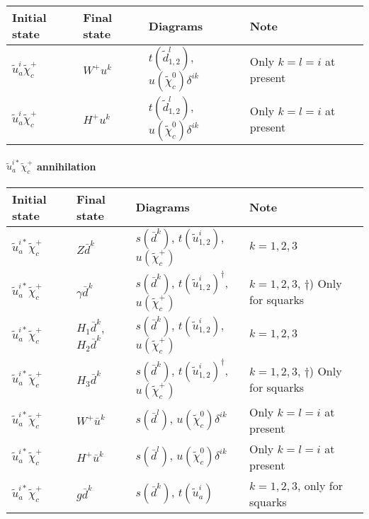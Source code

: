 \begin{center}
\begin{tabular}{llll} \hline
{\bfseries Initial state} & {\bfseries Final state} &
{\bfseries Diagrams} & {\bfseries Note} \\ \hline \tabspace
$\tilde{u}^i_a \tilde{\chi}_{c}^+$ & $W^+ u^k$ &
$t(\tilde{d}^l_{1,2})$, $u(\tilde{\chi}_c^0)\delta^{ik}$ &
Only $k=l=i$ at present \\
$\tilde{u}^i_a \tilde{\chi}_{c}^+$ & $H^+ u^k$ &
$t(\tilde{d}^l_{1,2})$, $u(\tilde{\chi}_c^0)\delta^{ik}$ 
& Only $k=l=i$ at present \\ \hline
\end{tabular}
\end{center}

\paragraph{$\tilde{u}^{i*}_{a} \tilde{\chi}_{c}^{+}$ annihilation}

\begin{center}
\begin{tabular}{llll} \hline
{\bfseries Initial state} & {\bfseries Final state} &
{\bfseries Diagrams} & {\bfseries Note} \\ \hline \tabspace
$\tilde{u}^{i*}_a \tilde{\chi}_{c}^+$ & $Z \bar{d}^k$ &
$s(\bar{d}^k)$, $t(\tilde{u}^i_{1,2})$, $u(\tilde{\chi}_c^+)$ 
& $k=1,2,3$ \\
$\tilde{u}^{i*}_a \tilde{\chi}_{c}^+$ & $\gamma \bar{d}^k$ &
$s(\bar{d}^k)$, $t(\tilde{u}^i_{1,2})^\dagger$, $u(\tilde{\chi}_c^+)$ 
& $k=1,2,3$, $\dagger$) Only for squarks \\
$\tilde{u}^{i*}_a \tilde{\chi}_{c}^+$ & $H_1 \bar{d}^k$, $H_2 \bar{d}^k$ &
$s(\bar{d}^k)$, $t(\tilde{u}^i_{1,2})$, $u(\tilde{\chi}_c^+)$
& $k=1,2,3$ \\
$\tilde{u}^{i*}_a \tilde{\chi}_{c}^+$ & $H_3 \bar{d}^k$ &
$s(\bar{d}^k)$, $t(\tilde{u}^i_{1,2})^\dagger$, $u(\tilde{\chi}_c^+)$ 
& $k=1,2,3$, $\dagger$) Only for squarks\\
$\tilde{u}^{i*}_a \tilde{\chi}_{c}^+$ & $W^+ \bar{u}^k$ &
$s(\bar{d}^l)$, $u(\tilde{\chi}_c^0)\delta^{ik}$ 
& Only $k=l=i$ at present \\
$\tilde{u}^{i*}_a \tilde{\chi}_{c}^+$ & $H^+ \bar{u}^k$ &
$s(\bar{d}^l)$, $u(\tilde{\chi}_c^0)\delta^{ik}$ 
& Only $k=l=i$ at present \\
$\tilde{u}^{i*}_a \tilde{\chi}_{c}^+$ & $g \bar{d}^k$ &
$s(\bar{d}^k)$, $t(\tilde{u}_a^i)$ 
& $k=1,2,3$, only for squarks \\ \hline
\end{tabular}
\end{center}

